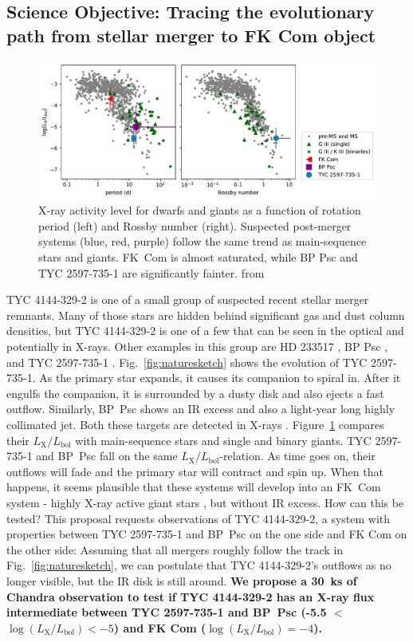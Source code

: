 \documentclass[letterpaper,11pt]{article}
\begin{document}
\subsection*{Science Objective: Tracing the evolutionary path from stellar merger to FK Com object}


\begin{figure}
    \includegraphics[width=.7\textwidth]{lxlbol}
    \caption{X-ray activity level for dwarfs and giants as a function of rotation period (left) and Rossby number (right). Suspected post-merger systems (blue, red, purple) follow the same trend as main-sequence stars and giants.  FK~Com is almost saturated, while BP Psc and TYC 2597-735-1 are significantly fainter. from \cite{2022arXiv220205424G}
    \label{fig:lxlbol}}
\end{figure}

 TYC 4144-329-2 is one of a small group of suspected recent stellar merger remnants. Many of those stars are hidden behind significant gas and dust column densities, but 
 TYC 4144-329-2 is one of a few that can be seen in the optical \cite{2020RNAAS...4..238M} and potentially in X-rays. Other examples in this group are HD 233517 \cite{2003ApJ...582.1032J}, BP Psc \cite{Zuckerman_2008}, and  TYC 2597-735-1 \cite{2020Natur.587..387H}. Fig.~\ref{fig:naturesketch} shows the evolution of TYC 2597-735-1. As the primary star expands, it causes its companion to spiral in. After it engulfs the companion, it is surrounded by a dusty disk and also ejects a fast outflow. Similarly, BP~Psc shows an IR excess and also a light-year long highly collimated jet. Both these targets are detected in X-rays \cite{2010ApJ...719L..65K,2022arXiv220205424G}. Figure~\ref{fig:lxlbol} compares their $L_\mathrm{X}/L_\mathrm{bol}$ with main-sequence stars and single and binary giants. TYC 2597-735-1 and BP~Psc fall on the same $L_\mathrm{X}/L_\mathrm{bol}$-relation. As time goes on, their outflows will fade and the primary star will contract and spin up. When that happens, it seems plausible that these systems will develop into an FK~Com system - highly X-ray active giant stars \cite{2016ApJS..223....5A}, but without IR excess. How can this be tested? This proposal requests observations of TYC 4144-329-2, a system with properties between 
TYC 2597-735-1 and BP~Psc on the one side and FK Com on the other side: Assuming that all mergers roughly follow the track in Fig.~\ref{fig:naturesketch}, we can postulate that TYC 4144-329-2's outflows as no longer visible, but the IR disk is still around. \textbf{We propose a 30~ks of Chandra observation to test if TYC 4144-329-2 has an X-ray flux intermediate between TYC 2597-735-1 and BP~Psc  (-5.5 $<$ $\log(L_\mathrm{X}/L_\mathrm{bol}) <-5$) and FK Com ($\log(L_\mathrm{X}/L_\mathrm{bol}) =-4$).}
\end{document}

